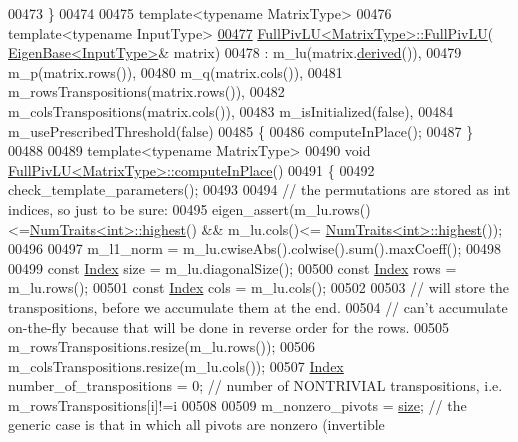 \begin{DoxyCode}
00473 \}
00474 
00475 \textcolor{keyword}{template}<\textcolor{keyword}{typename} MatrixType>
00476 \textcolor{keyword}{template}<\textcolor{keyword}{typename} InputType>
\hyperlink{group___l_u___module_a3e903b9f401e3fc5d1ca7c6951c76185}{00477} \hyperlink{group___l_u___module_af225528d1c6e623a2b1dce091907d13e}{FullPivLU<MatrixType>::FullPivLU}(
      \hyperlink{group___core___module_struct_eigen_1_1_eigen_base}{EigenBase<InputType>}& matrix)
00478   : m\_lu(matrix.\hyperlink{group___core___module_a324b16961a11d2ecfd2d1b7dd7946545}{derived}()),
00479     m\_p(matrix.rows()),
00480     m\_q(matrix.cols()),
00481     m\_rowsTranspositions(matrix.rows()),
00482     m\_colsTranspositions(matrix.cols()),
00483     m\_isInitialized(false),
00484     m\_usePrescribedThreshold(false)
00485 \{
00486   computeInPlace();
00487 \}
00488 
00489 \textcolor{keyword}{template}<\textcolor{keyword}{typename} MatrixType>
00490 \textcolor{keywordtype}{void} \hyperlink{group___l_u___module_class_eigen_1_1_full_piv_l_u}{FullPivLU<MatrixType>::computeInPlace}()
00491 \{
00492   check\_template\_parameters();
00493 
00494   \textcolor{comment}{// the permutations are stored as int indices, so just to be sure:}
00495   eigen\_assert(m\_lu.rows()<=\hyperlink{group___core___module_struct_eigen_1_1_num_traits}{NumTraits<int>::highest}() && m\_lu.cols()<=
      \hyperlink{group___core___module_struct_eigen_1_1_num_traits}{NumTraits<int>::highest}());
00496 
00497   m\_l1\_norm = m\_lu.cwiseAbs().colwise().sum().maxCoeff();
00498 
00499   \textcolor{keyword}{const} \hyperlink{group___core___module_a554f30542cc2316add4b1ea0a492ff02}{Index} size = m\_lu.diagonalSize();
00500   \textcolor{keyword}{const} \hyperlink{group___core___module_a554f30542cc2316add4b1ea0a492ff02}{Index} rows = m\_lu.rows();
00501   \textcolor{keyword}{const} \hyperlink{group___core___module_a554f30542cc2316add4b1ea0a492ff02}{Index} cols = m\_lu.cols();
00502 
00503   \textcolor{comment}{// will store the transpositions, before we accumulate them at the end.}
00504   \textcolor{comment}{// can't accumulate on-the-fly because that will be done in reverse order for the rows.}
00505   m\_rowsTranspositions.resize(m\_lu.rows());
00506   m\_colsTranspositions.resize(m\_lu.cols());
00507   \hyperlink{group___core___module_a554f30542cc2316add4b1ea0a492ff02}{Index} number\_of\_transpositions = 0; \textcolor{comment}{// number of NONTRIVIAL transpositions, i.e.
       m\_rowsTranspositions[i]!=i}
00508 
00509   m\_nonzero\_pivots = \hyperlink{group___core___module_ac2c9348df3bb9c0044dbae6c278a8977}{size}; \textcolor{comment}{// the generic case is that in which all pivots are nonzero (invertible
}
\end{DoxyCode}
